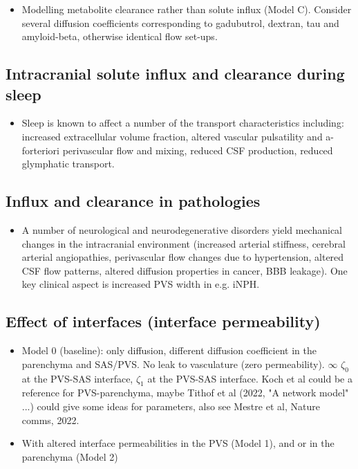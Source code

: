 \documentclass[fleqn,10pt]{wlscirep}
\newcommand{\draft}[1]{\textcolor{gray}{#1}}
\begin{document}
\draft{\lipsum[1]}

\begin{itemize}
\item 
  Modelling metabolite clearance rather than solute influx (Model
  C). Consider several diffusion coefficients corresponding to
  gadubutrol, dextran, tau and amyloid-beta, otherwise identical flow
  set-ups.
\end{itemize}

\subsection*{Intracranial solute influx and clearance during sleep}

\begin{itemize}
\item
  Sleep is known to affect a number of the transport characteristics including: increased extracellular volume fraction, altered vascular pulsatility and a-forteriori perivascular flow and mixing, reduced CSF production, reduced glymphatic transport.
\end{itemize}

\draft{\lipsum[1]}

\subsection*{Influx and clearance in pathologies}

\begin{itemize}
\item
  A number of neurological and neurodegenerative disorders yield mechanical changes in the intracranial environment (increased arterial stiffness, cerebral arterial angiopathies, perivascular flow changes due to hypertension, altered CSF flow patterns, altered diffusion properties in cancer, BBB leakage). One key clinical aspect is increased PVS width in e.g. iNPH. 
\end{itemize}

\draft{\lipsum[1]}



\iffalse
\newpage
\subsection*{Effect of interfaces (interface permeability)}

\begin{itemize}
    \item Model 0 (baseline): only diffusion, different diffusion coefficient in the parenchyma and SAS/PVS. No leak to vasculature (zero permeability). $\infty$ $\zeta_0$ at the PVS-SAS interface, $\zeta_1$ at the PVS-SAS interface. Koch et al could be a reference for PVS-parenchyma, maybe Tithof et al (2022, "A network model" ...) could give some ideas for parameters, also see Mestre et al, Nature comms, 2022. 
    \item 
    With altered interface permeabilities in the PVS (Model 1), and or in the parenchyma (Model 2) 
    \end{itemize}
\end{document}
